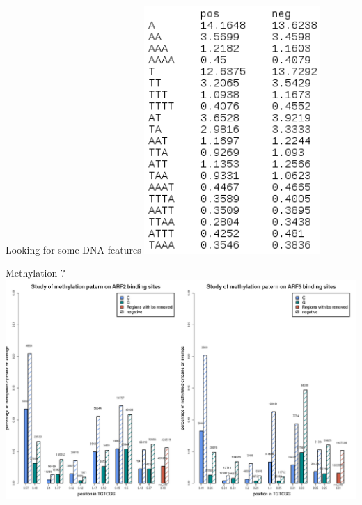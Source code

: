 \documentclass{beamer}
\begin{document}
\begin{frame}{Looking for some DNA features}
  \includegraphics[width=0.5\textwidth,height=0.6\textheight,center]{A_and_T_rate.png}
\end{frame}




\begin{frame}{Methylation ? }
  \includegraphics[width=1\textwidth,height=0.90\textheight,center]{ARF2_ARF5_methylation_and_sample_sizes_v3.png}
\end{frame}
\end{document}
